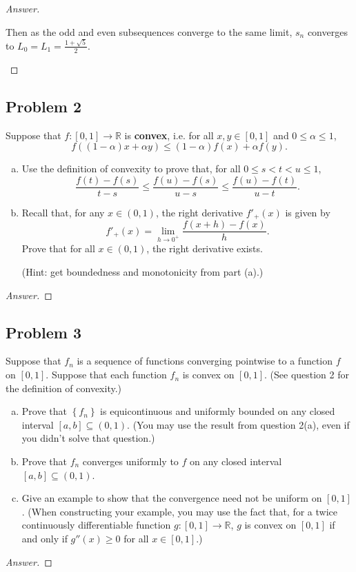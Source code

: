 \documentclass[12pt]{article}
\newcommand{\real}{\mathbb{R}}
\newcommand\setb[1]{\left \{ #1 \right \}}
\theoremstyle{definition}
\begin{document}
\begin{proof}[Answer]
\begin{enumerate}[(I)]
        Then as the odd and even subsequences converge to the same limit, $s_n$ converges to $L_0 = L_1 = \frac{1 + \sqrt{5}}{2}$. 
    \end{enumerate}
\end{proof}

\subsection{Problem 2}
Suppose that $f : [0,1] \to \real$ is \textbf{convex}, i.e. for all $x , y \in [0,1]$ and $0 \leq \alpha \leq 1$, 
\[
    f( (1 - \alpha) x + \alpha y ) \leq (1 - \alpha) f(x) + \alpha f(y) .
\]
\begin{enumerate}[(a)]
    \item Use the definition of convexity to prove that, for all $0 \leq s < t < u \leq 1$, 
    \[
        \frac{f(t) - f(s)}{t - s} \leq \frac{f(u) - f(s)}{u - s} \leq \frac{f(u) - f(t)}{u - t} . 
    \]
    \item Recall that, for any $x \in (0,1)$, the right derivative $f'_{+}(x)$ is given by 
    \[
        f'_{+}(x) = \lim\limits_{h \to 0^+} \frac{f(x+h) - f(x)}{h} . 
    \]
    Prove that for all $x \in (0,1)$, the right derivative exists. 
    
    \noindent (Hint: get boundedness and monotonicity from part (a).)
\end{enumerate}

\begin{proof}[Answer]
    
\end{proof}

\subsection{Problem 3}
Suppose that $f_n$ is a sequence of functions converging pointwise to a function $f$ on $[0,1]$. Suppose that each function $f_n$ is convex on $[0,1]$. (See question 2 for the definition of convexity.)
\begin{enumerate}[(a)]
    \item Prove that $\setb{ f_n }$ is equicontinuous and uniformly bounded on any closed interval $[a,b] \subseteq (0,1)$. (You may use the result from question 2(a), even if you didn't solve that question.)
    \item Prove that $f_n$ converges uniformly to $f$ on any closed interval $[a,b] \subseteq (0,1)$. 
    \item Give an example to show that the convergence need not be uniform on $[0,1]$. (When constructing your example, you may use the fact that, for a twice continuously differentiable function $g : [0,1] \to \real$, $g$ is convex on $[0,1]$ if and only if $g''(x) \geq 0$ for all $x \in [0,1]$.)
\end{enumerate}
\begin{proof}[Answer]
    
\end{proof}
\end{document}
